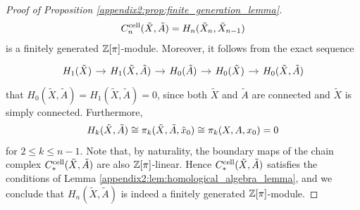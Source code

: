 \begin{proof}[Proof of Proposition \ref{appendix2:prop:finite_generation_lemma}]
    \[
    C_n^\mathrm{cell}(\tilde{X},\tilde{A}) = H_n(\tilde{X}_{n},\tilde{X}_{n-1})
    \]
    is a finitely generated $\mathbb{Z}[\pi]$-module. Moreover, it follows from the exact sequence
    \[\begin{tikzcd}[column sep = 1em]
	{H_1(\tilde{X})} & {H_1(\tilde{X}, \tilde{A})} & {H_0(\tilde{A})} & {H_0(\tilde{X})} & {H_0(\tilde{X}, \tilde{A})}
	\arrow[from=1-1, to=1-2]
	\arrow[from=1-2, to=1-3]
	\arrow[from=1-3, to=1-4]
	\arrow[from=1-4, to=1-5]
\end{tikzcd}\]
that $H_0(\tilde{X}, \tilde{A}) = H_1(\tilde{X}, \tilde{A}) = 0$, since both $\tilde{X}$ and $\tilde{A}$ are connected and $\tilde{X}$ is simply connected. Furthermore, 
\[
H_k(\tilde{X}, \tilde{A}) \cong \pi_k(\tilde{X}, \tilde{A}, \tilde{x}_0) \cong \pi_k(X,A,x_0) = 0
\]
for $2 \leq k \leq n-1$. Note that, by naturality, the boundary maps of the chain complex $C_\ast^\mathrm{cell}(\tilde{X},\tilde{A})$ are also $\mathbb{Z}[\pi]$-linear. Hence $C_\ast^\mathrm{cell}(\tilde{X},\tilde{A})$ satisfies the conditions of Lemma \ref{appendix2:lem:homological_algebra_lemma}, and we conclude that $H_n(\tilde{X}, \tilde{A})$ is indeed a finitely generated $\mathbb{Z}[\pi]$-module.
\end{proof}
